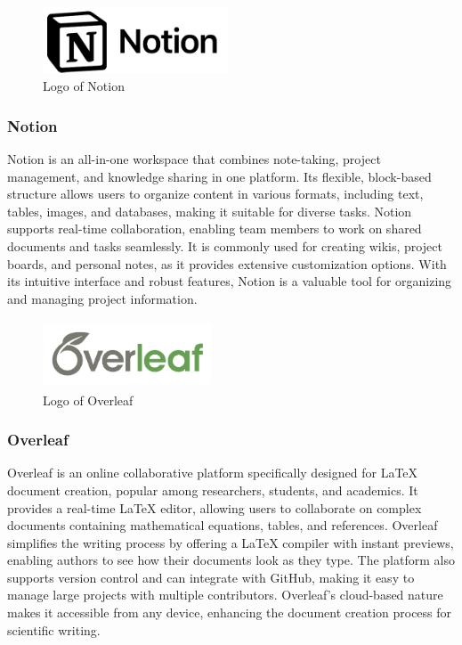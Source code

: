         \begin{figure}[htbp]
            \centerline{\includegraphics[width=5.5cm, height=2cm]{Images/logo/notion.png}}
            \caption{Logo of Notion}
            \label{fig}
        \end{figure}
        \subsubsection{Notion}
            Notion is an all-in-one workspace that combines note-taking, project management, and knowledge sharing in one platform. Its flexible, block-based structure allows users to organize content in various formats, including text, tables, images, and databases, making it suitable for diverse tasks. Notion supports real-time collaboration, enabling team members to work on shared documents and tasks seamlessly. It is commonly used for creating wikis, project boards, and personal notes, as it provides extensive customization options. With its intuitive interface and robust features, Notion is a valuable tool for organizing and managing project information.


        \begin{figure}[htbp]
            \centerline{\includegraphics[width=5cm, height=2cm]{Images/logo/overleaf.png}}
            \caption{Logo of Overleaf}
            \label{fig}
        \end{figure}
        \subsubsection{Overleaf}
            Overleaf is an online collaborative platform specifically designed for LaTeX document creation, popular among researchers, students, and academics. It provides a real-time LaTeX editor, allowing users to collaborate on complex documents containing mathematical equations, tables, and references. Overleaf simplifies the writing process by offering a LaTeX compiler with instant previews, enabling authors to see how their documents look as they type. The platform also supports version control and can integrate with GitHub, making it easy to manage large projects with multiple contributors. Overleaf’s cloud-based nature makes it accessible from any device, enhancing the document creation process for scientific writing.

